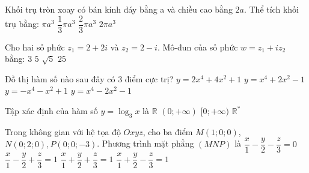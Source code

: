 \begin{ex}%
Khối trụ tròn xoay có bán kính đáy bằng a và chiều cao bằng $2{a}$. Thể tích khối trụ bằng:
\choice
{$\pi a^3$}
{$\dfrac{1}{3} \pi a^3$}
{$\dfrac{2}{3} \pi a^3$}
{\True $2\pi a^3$}

\end{ex}
\begin{ex}%
Cho hai số phức $z_1=2+2 i$ và $z_2=2-i$. Mô-đun của số phức $w=z_1+i z_2$ bằng:
\choice
{$3$}
{\True $5$}
{$\sqrt{5}$}
{$25$}

\end{ex}
\begin{ex}%
Đồ thị hàm số nào sau đây có $3$ điểm cực trị?
\choice
{$y=2 x^4+4 x^2+1$}
{$y=x^4+2 x^2-1$}
{$y=-x^4-x^2+1$}
{\True $y=x^4-2 x^2-1$}

\end{ex}
\begin{ex}%
Tập xác định của hàm số $y=\log_3 x$ là
\choice
{$\mathbb{R}$}
{\True $(0;+\infty)$}
{$[0;+\infty)$}
{$\mathbb{R}^{*}$}

\end{ex}
\begin{ex}%
Trong không gian với hệ tọa độ $O x y z$, cho ba điểm $M(1; 0; 0)$, $N(0; 2; 0), P(0; 0;-3)$. Phương trình mặt phẳng $(MNP)$ là
\choice
{$\dfrac{x}{1}-\dfrac{y}{2}-\dfrac{z}{3}=0$}
{$\dfrac{x}{1}-\dfrac{y}{2}+\dfrac{z}{3}=1$}
{$\dfrac{x}{1}+\dfrac{y}{2}+\dfrac{z}{3}=1$}
{\True $\dfrac{x}{1}+\dfrac{y}{2}-\dfrac{z}{3}=1$}

\end{ex}


